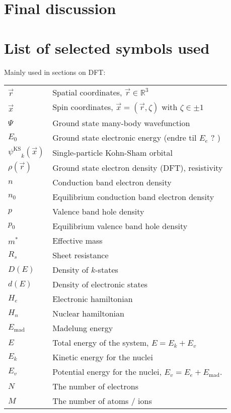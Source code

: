 \documentclass[11pt,bibliography=totoc,index=totoc]{scrbook}   %
\newcommand{\ksorb}{\ensuremath{\psi^{\mathrm{KS}}}}
\begin{document}
\chapter{Final discussion}


\printbibliography

\appendix
\chapter{List of selected symbols used}
  Mainly used in sections on DFT:

  \begin{tabular}{ll}
    $\vec{r}$ & Spatial coordinates, $\vec{r}\in\mathbb{R}^3$ \\
    $\vec{x}$ & Spin coordinates, $\vec{x}=(\vec{r},\zeta)$ with $\zeta\in\pm 1$ \\
    $\Psi$  & Ground state many-body wavefunction \\
    $E_0$   & Ground state electronic energy (endre til $E_e$ ? ) \\
    $\ksorb_k(\vec{x})$  & Single-particle Kohn-Sham orbital \\
    $\rho(\vec{r})$  & Ground state electron density (DFT), resistivity \\
	$n$		& Conduction band electron density \\
	$n_0$	& Equilibrium conduction band electron density \\
	$p$		& Valence band hole density \\
	$p_0$	& Equilibrium valence band hole density \\
	$m^*$	& Effective mass \\
	$R_s$	& Sheet resistance \\
	$D(E)$	& Density of $k$-states \\
	$d(E)$	& Density of electronic states \\
    $H_e$   & Electronic hamiltonian \\
    $H_n$   & Nuclear hamiltonian \\
    $E_{\text{mad}}$ & Madelung energy \\
    $E$     & Total energy of the system, $E = E_k + E_v$ \\
    $E_k$   & Kinetic energy for the nuclei \\
    $E_v$   & Potential energy for the nuclei, $E_v = E_e + E_{\text{mad}}$. \\
    $N$     & The number of electrons \\
    $M$     & The number of atoms / ions
  \end{tabular}
\end{document}
